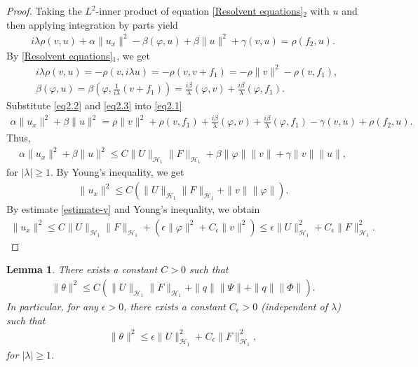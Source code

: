 \documentclass[11pt,reqno]{article}
\newtheorem{lemma}[theorem]{Lemma}
\begin{document}
  \begin{proof}
  	Taking the $L^2$-inner product of equation \eqref{Resolvent equations}$_2$ with $u$ and then applying integration by parts yield
  	\begin{align}\label{eq2.1}
  		i \lambda \rho (v, u) + \alpha \| u_x \|^2 - \beta (\varphi, u) + \beta \| u \|^2 + \gamma (v, u) = \rho (f_2, u).
  	\end{align}
  	By \eqref{Resolvent equations}$_1$, we get
  	\begin{align}
  		&i \lambda \rho (v, u) = - \rho(v,i\lambda u) = - \rho(v,v+f_1) = -\rho \|v\|^2 - \rho (v,f_1),\label{eq2.2}\\
  		&\beta(\varphi,u) = \beta(\varphi,\frac{1}{i\lambda}(v+f_1))=\frac{i\beta}{\lambda}(\varphi,v)+\frac{i\beta}{\lambda}(\varphi,f_1).\label{eq2.3}
  	\end{align}
  	Substitute \eqref{eq2.2} and \eqref{eq2.3} into \eqref{eq2.1}
  	\begin{align*}
  		\alpha \| u_x \|^2 + \beta \| u \|^2
  		= \rho \| v \|^2 + \rho (v, f_1) + \frac{i\beta}{\lambda} (\varphi, v) +\frac{i\beta}{ \lambda} (\varphi, f_1) - \gamma (v, u) + \rho (f_2, u).
  	\end{align*}
  	Thus,
  	\begin{align*}
  		\alpha \|u_x\|^2 + \beta \|u\|^2
  		\leq C\|U\|_{\mathcal{H}_1}\|F\|_{\mathcal{H}_1} + \beta \|\varphi\|\|v\| + \gamma \|v\|\|u\|,
  	\end{align*}
  	for $|\lambda| \geq 1$.
  	By Young's inequality, we get
  	\begin{align*}
  		\|u_x\|^2 \leq C(\|U\|_{\mathcal{H}_1}\|F\|_{\mathcal{H}_1} + \|v\|\|\varphi\|).
  	\end{align*}
  	By estimate \eqref{estimate-v} and Young's inequality, we obtain
  	\begin{align*}
  		\|u_x\|^2\leq C\|U\|_{\mathcal{H}_1}\|F\|_{\mathcal{H}_1} + (\epsilon \|\varphi\|^2 + C_{\epsilon}\|v\|^2) \leq \epsilon\|U\|_{\mathcal{H}_1}^2 + C_{\epsilon}\|F\|_{\mathcal{H}_1}^2.
  	\end{align*}
  \end{proof}
  \begin{lemma}\label{lemma-theta}
  	There exists a constant $C>0$ such that
  	\begin{align}\label{estimate-thete-1}
  		\|\theta\|^2 \leq C(\|U\|_{\mathcal{H}_1}\|F\|_{\mathcal{H}_1} + \|q\|\|\Psi\| + \|q\|\|\Phi\|).
  	\end{align}
  	In particular, for any $\epsilon>0$, there exists a constant $C_{\epsilon}>0$ (independent of $\lambda$) such that
  	\begin{align}\label{estimate-theta-2}
  		\|\theta\|^2 \leq \epsilon\|U\|_{\mathcal{H}_1}^2 + C_{\epsilon}\|F\|_{\mathcal{H}_1}^2,
  	\end{align}
  	for $|\lambda| \geq 1$.
  \end{lemma}
\end{document}
